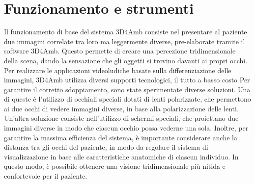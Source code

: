 \documentclass[
a4paper,
cleardoublepage=empty,
headings=twolinechapter,
numbers=autoenddot,
]{scrbook}
\begin{document}
	\section{Funzionamento e strumenti}
	Il funzionamento di base del sistema 3D4Amb consiste nel presentare al paziente due immagini correlate tra loro ma leggermente diverse, pre-elaborate tramite il software 3D4Amb. Questo permette di creare una percezione tridimensionale della scena, dando la sensazione che gli oggetti si trovino davanti ai propri occhi.
	Per realizzare le applicazioni videoludiche basate sulla differenziazione delle immagini, 3D4Amb utilizza diversi supporti tecnologici, il tutto a basso costo
	Per garantire il corretto sdoppiamento, sono state sperimentate diverse soluzioni. Una di queste è l'utilizzo di occhiali speciali dotati di lenti polarizzate, che permettono ai due occhi di vedere immagini diverse, in base alla polarizzazione delle lenti. Un'altra soluzione consiste nell'utilizzo di schermi speciali, che proiettano due immagini diverse in modo che ciascun occhio possa vederne una sola.
	Inoltre, per garantire la massima efficienza del sistema, è importante considerare anche la distanza tra gli occhi del paziente, in modo da regolare il sistema di visualizzazione in base alle caratteristiche anatomiche di ciascun individuo. In questo modo, è possibile ottenere una visione tridimensionale più nitida e confortevole per il paziente.
\end{document}

